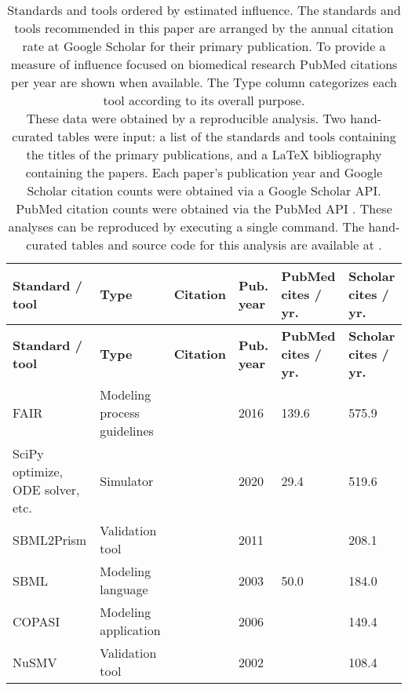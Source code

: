 
\begin{longtable}{ |m{2.2cm}|m{5cm}|m{1.2cm}|m{1cm}|m{1.2cm}|m{1cm}| } 
\caption{Standards and tools ordered by estimated influence.
The standards and tools recommended in this paper are arranged by the annual citation rate at Google Scholar for their
primary publication.
To provide a measure of influence focused on biomedical research PubMed citations per year are shown when available.
The Type column categorizes each tool according to its overall purpose.\\
These data were obtained by a reproducible analysis.
Two hand-curated tables were input: a list of the standards and tools containing the titles of the primary publications, and a LaTeX bibliography containing the papers.
Each paper's publication year and Google Scholar citation counts were obtained via a Google Scholar API.
PubMed citation counts were obtained via the PubMed API \cite{sayers2010general}.
These analyses can be reproduced by executing a single command.
The hand-curated tables and source code for this analysis are available at \cite{GoldbergReproToolsAnalysis}.
}\\\hline
\textbf{\scriptsize{Standard / tool}} &\textbf{\scriptsize{Type}} &\textbf{\scriptsize{Citation}} &\textbf{\scriptsize{Pub. year}} &\textbf{\scriptsize{PubMed cites / yr.}} &\textbf{\scriptsize{Scholar cites / yr.}}\\ 
\hline
\endfirsthead\hline
\textbf{\scriptsize{Standard / tool}} &\textbf{\scriptsize{Type}} &\textbf{\scriptsize{Citation}} &\textbf{\scriptsize{Pub. year}} &\textbf{\scriptsize{PubMed cites / yr.}} &\textbf{\scriptsize{Scholar cites / yr.}}\\ 
\hline
\endhead\small{FAIR} &\small{Modeling process guidelines} &\cite{Wilkinson2016TheStewardship.} &\small{2016} &\small{139.6} &\small{575.9}\\
\hline
\small{SciPy optimize, ODE solver, etc.} &\small{Simulator} &\cite{virtanen2020scipy} &\small{2020} &\small{29.4} &\small{519.6}\\
\hline
\small{SBML2Prism} &\small{Validation tool} &\cite{Kwiatkowska2011PRISMSystems} &\small{2011} &\small{} &\small{208.1}\\
\hline
\small{SBML} &\small{Modeling language} &\cite{Hucka2003TheModels} &\small{2003} &\small{50.0} &\small{184.0}\\
\hline
\small{COPASI} &\small{Modeling application} &\cite{Hoops2006COPASI--aSImulator} &\small{2006} &\small{} &\small{149.4}\\
\hline
\small{NuSMV} &\small{Validation tool} &\cite{Cimatti2002NuSMVChecking} &\small{2002} &\small{} &\small{108.4}\\

\end{longtable}
